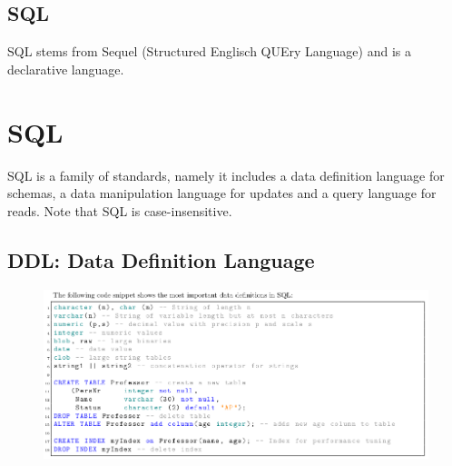 \documentclass[11pt,oneside,a4paper]{article}
\begin{document}
\subsection{SQL}

SQL stems from Sequel (Structured Englisch QUEry Language) and is a declarative language.

\newpage

\titlespacing{\subsection}{0pt}{0ex}{0ex}

\section{SQL}

SQL is a family of standards, namely it includes a data definition language for schemas, a data manipulation language for updates and a query language for reads. Note that SQL is case-insensitive.

\subsection{DDL: Data Definition Language}
\vspace{-\topsep}
\begin{figure}[hb!]
	\centering
	\includegraphics[width=1\linewidth]{figures/sql_1}
	\label{fig:sql1}
\end{figure}
\vspace{-\topsep}
\end{document}
